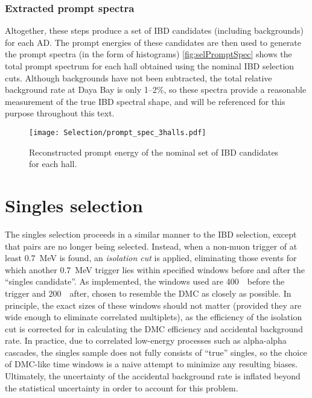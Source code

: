 \documentclass[../thesis.tex]{subfiles}
\begin{document}
\subsubsection{Extracted prompt spectra}
\label{sec:selPromptSpec}

Altogether, these steps produce a set of IBD candidates (including backgrounds) for each AD. The prompt energies of these candidates are then used to generate the prompt spectra (in the form of histograms) \autoref{fig:selPromptSpec} shows the total prompt spectrum for each hall obtained using the nominal IBD selection cuts. Although backgrounds have not been subtracted, the total relative background rate at Daya Bay is only 1--2\%, so these spectra provide a reasonable measurement of the true IBD spectral shape, and will be referenced for this purpose throughout this text.

\begin{figure}[h]
  \texttt{[image: Selection/prompt\_spec\_3halls.pdf]}
  \caption{Reconstructed prompt energy of the nominal set of IBD candidates for each hall.}
  \label{fig:selPromptSpec}
\end{figure}

\section{Singles selection}
\label{sec:selSingles}

The singles selection proceeds in a similar manner to the IBD selection, except that pairs are no longer being selected. Instead, when a non-muon trigger of at least 0.7~MeV is found, an \emph{isolation cut} is applied, eliminating those events for which another 0.7~MeV trigger lies within specified windows before and after the ``singles candidate''. As implemented, the windows used are 400~\us\ before the trigger and 200~\us\ after, chosen to resemble the DMC as closely as possible. In principle, the exact sizes of these windows should not matter (provided they are wide enough to eliminate correlated multiplets), as the efficiency of the isolation cut is corrected for in calculating the DMC efficiency and accidental background rate. In practice, due to correlated low-energy processes such as alpha-alpha cascades, the singles sample does not fully consists of ``true'' singles, so the choice of DMC-like time windows is a naive attempt to minimize any resulting biases. Ultimately, the uncertainty of the accidental background rate is inflated beyond the statistical uncertainty in order to account for this problem.
\end{document}
